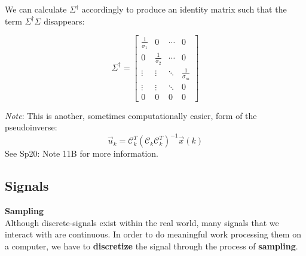 We can calculate $\Sigma^{\dagger}$ accordingly to produce an identity matrix such that the term $\Sigma^{\dagger}\Sigma$ disappears:

$$\Sigma^{\dagger} = \begin{bmatrix} \frac{1}{\sigma_{1}} & 0 &  \cdots & 0 \\ 0 & \frac{1}{\sigma_{2}} & \cdots & 0 \\ \vdots & \vdots & \ddots & \frac{1}{\sigma_{m}} \\ 
    \vdots & \vdots & \ddots & 0 \\ 0 & 0 & 0 & 0 \end{bmatrix}$$

\textit{Note}: This is another, sometimes computationally easier, form of the pseudoinverse:
$$\vec{u}_k = \mathcal{C}_k^T(\mathcal{C}_k\mathcal{C}_k^T)^{-1}\vec{x}(k)$$
See Sp20: Note 11B for more information.

\newpage

\subsection*{Signals}
\textbf{Sampling} \\
Although discrete-signals exist within the real world, many signals that we interact with are continuous. In order to do meaningful work processing them on a computer, we have to \textbf{discretize} the signal through the process of \textbf{sampling}.

\begin{figure}[H]
\end{figure}

